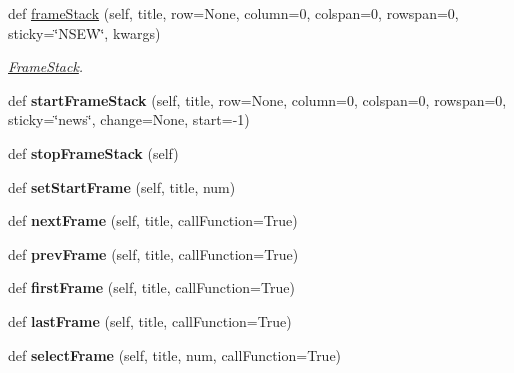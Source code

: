 \begin{DoxyCompactItemize}
def \hyperlink{classappjar_1_1gui_aa7d26d744e9dd74c0696c9cecb4dd002}{frame\+Stack} (self, title, row=None, column=0, colspan=0, rowspan=0, sticky=\char`\"{}N\+S\+EW\char`\"{}, kwargs)
\begin{DoxyCompactList}\small\item\em \hyperlink{classappjar_1_1_frame_stack}{Frame\+Stack}. \end{DoxyCompactList}\item 
\mbox{\label{classappjar_1_1gui_a432155eca945616662d6d18b96da8650}} 
def {\bfseries start\+Frame\+Stack} (self, title, row=None, column=0, colspan=0, rowspan=0, sticky=\char`\"{}news\char`\"{}, change=None, start=-\/1)
\item 
\mbox{\label{classappjar_1_1gui_ae26ec5f79eb023e95532139a0a626cab}} 
def {\bfseries stop\+Frame\+Stack} (self)
\item 
\mbox{\label{classappjar_1_1gui_a83b21e672b66390b5d45fa0fee508279}} 
def {\bfseries set\+Start\+Frame} (self, title, num)
\item 
\mbox{\label{classappjar_1_1gui_a59a343d16e5d55dbdbdeb66ad26cdeb0}} 
def {\bfseries next\+Frame} (self, title, call\+Function=True)
\item 
\mbox{\label{classappjar_1_1gui_a3da3eae6d65c68bf7a244c5eca6fd3b5}} 
def {\bfseries prev\+Frame} (self, title, call\+Function=True)
\item 
\mbox{\label{classappjar_1_1gui_a0085e8976c218eee5ab5819141777310}} 
def {\bfseries first\+Frame} (self, title, call\+Function=True)
\item 
\mbox{\label{classappjar_1_1gui_a3ba76bc4843ff4d4ce4c0184049ebaf2}} 
def {\bfseries last\+Frame} (self, title, call\+Function=True)
\item 
\mbox{\label{classappjar_1_1gui_add45d697fffe01169c94f4323e30c9df}} 
def {\bfseries select\+Frame} (self, title, num, call\+Function=True)
\item 
\mbox{\label{classappjar_1_1gui_a45987bcb084b97d1ce4dd5f1a86b853e}} 

\end{DoxyCompactItemize}
